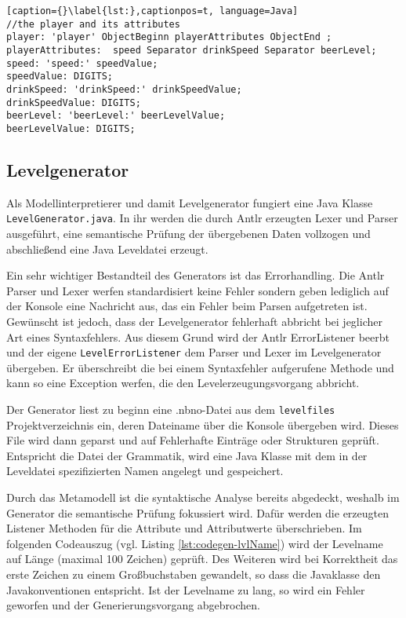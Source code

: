 \begin{lstlisting}[caption={}\label{lst:},captionpos=t, language=Java] 
//the player and its attributes
player: 'player' ObjectBeginn playerAttributes ObjectEnd ;
playerAttributes:  speed Separator drinkSpeed Separator beerLevel;
speed: 'speed:' speedValue;
speedValue: DIGITS;
drinkSpeed: 'drinkSpeed:' drinkSpeedValue;
drinkSpeedValue: DIGITS;
beerLevel: 'beerLevel:' beerLevelValue;
beerLevelValue: DIGITS;
\end{lstlisting}

\subsection{Levelgenerator}

Als Modellinterpretierer und damit Levelgenerator fungiert eine Java Klasse \texttt{LevelGenerator.java}. In ihr werden die durch Antlr erzeugten Lexer und Parser ausgeführt, eine semantische Prüfung der übergebenen Daten vollzogen und abschließend eine Java Leveldatei erzeugt.

Ein sehr wichtiger Bestandteil des Generators ist das Errorhandling. Die Antlr Parser und Lexer werfen standardisiert keine Fehler sondern geben lediglich auf der Konsole eine Nachricht aus, das ein Fehler beim Parsen aufgetreten ist. Gewünscht ist jedoch, dass der Levelgenerator fehlerhaft abbricht bei jeglicher Art eines Syntaxfehlers. Aus diesem Grund wird der Antlr ErrorListener beerbt und der eigene \texttt{LevelErrorListener} dem Parser und Lexer im Levelgenerator übergeben. Er überschreibt die bei einem Syntaxfehler aufgerufene Methode und kann so eine Exception werfen, die den Levelerzeugungsvorgang abbricht.

Der Generator liest zu beginn eine .nbno-Datei aus dem \texttt{levelfiles} Projektverzeichnis ein, deren Dateiname über die Konsole übergeben wird. Dieses File wird dann geparst und auf Fehlerhafte Einträge oder Strukturen geprüft. Entspricht die Datei der Grammatik, wird eine Java Klasse mit dem in der Leveldatei spezifizierten Namen angelegt und gespeichert.

Durch das Metamodell ist die syntaktische Analyse bereits abgedeckt, weshalb im Generator die semantische Prüfung fokussiert wird. Dafür werden die erzeugten Listener Methoden für die Attribute und Attributwerte überschrieben. Im folgenden Codeauszug (vgl. Listing \ref{lst:codegen-lvlName}) wird der Levelname auf Länge (maximal 100 Zeichen) geprüft. Des Weiteren wird bei Korrektheit das erste Zeichen zu einem Großbuchstaben gewandelt, so dass die Javaklasse den Javakonventionen entspricht. Ist der Levelname zu lang, so wird ein Fehler geworfen und der Generierungsvorgang abgebrochen.

